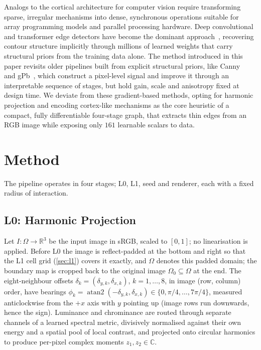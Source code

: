 \documentclass[11pt,a4paper]{article}
\newcommand{\R}{\mathbb{R}}
\begin{document}
Analogs to the cortical architecture for computer vision require transforming sparse, irregular mechanisms into dense, synchronous operations suitable for array programming models and parallel processing hardware. Deep convolutional and transformer edge detectors have become the dominant approach~\cite{xie2015hed,liu2017rcf,he2019bdcn,pu2022edter,soria2023dexined,ye2024diffusionedge}, recovering contour structure implicitly through millions of learned weights that carry structural priors from the training data alone. The method introduced in this paper revisits older pipelines built from explicit structural priors, like Canny~\cite{canny1986computational} and gPb~\cite{arbelaez2011gpb}, which construct a pixel-level signal and improve it through an interpretable sequence of stages, but hold gain, scale and anisotropy fixed at design time. We deviate from these gradient-based methods, opting for harmonic projection and encoding cortex-like mechanisms as the core heuristic of a compact, fully differentiable four-stage graph, that extracts thin edges from an RGB image while exposing only $161$ learnable scalars to data.

\section{Method}\label{sec:method}

The pipeline operates in four stages; L0, L1, seed and renderer, each with a fixed radius of interaction.

\subsection{L0: Harmonic Projection}\label{sec:l0}

Let $I:\Omega\to\R^3$ be the input image in sRGB, scaled to $[0,1]$; no linearisation is applied. Before L0 the image is reflect-padded at the bottom and right so that the L1 cell grid (\cref{sec:l1}) covers it exactly, and $\Omega$ denotes this padded domain; the boundary map is cropped back to the original image $\Omega_0 \subseteq \Omega$ at the end. The eight-neighbour offsets $\delta_k = (\delta_{y,k}, \delta_{x,k})$, $k = 1, \dots, 8$, in image (row, column) order, have bearings $\phi_k = \operatorname{atan2}(-\delta_{y,k}, \delta_{x,k}) \in \{0, \pi/4, \dots, 7\pi/4\}$, measured anticlockwise from the $+x$ axis with $y$ pointing up (image rows run downwards, hence the sign).
Luminance and chrominance are routed through separate channels of a learned spectral metric, divisively normalised against their own energy and a spatial pool of local contrast, and projected onto circular harmonics to produce per-pixel complex moments $z_1, z_2 \in \mathbb{C}$.
\end{document}
